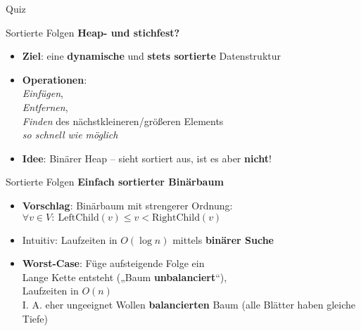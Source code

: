 \begin{frame}[t]{Quiz}
\end{frame}	



\begin{frame}{Sortierte Folgen}
	\textbf{Heap- und stichfest?} 
	\begin{itemize}
		\item \textbf{Ziel}: eine \textbf{dynamische} und \textbf{stets sortierte} Datenstruktur
		\pause
		\item \textbf{Operationen}: \\ 
		\emph{Einfügen}, \\
		\emph{Entfernen}, \\
		\emph{Finden} des nächstkleineren/größeren Elements \\
		\impl \emph{so schnell wie möglich}
		\pause
		\item \textbf{Idee}: Binärer Heap – sieht sortiert aus, ist es aber \textbf{nicht}!
	\end{itemize}
\end{frame}

\begin{frame}{Sortierte Folgen}
	\textbf{Einfach sortierter Binärbaum} 
	\begin{itemize} 
		\item \textbf{Vorschlag}: Binärbaum mit strengerer Ordnung: \\
		$\forall v \in V : \ \text{LeftChild}(v) \leq v < \text{RightChild}(v)$
		\pause
		\item Intuitiv: Laufzeiten in $O(\log n)$ mittels \textbf{binärer Suche}
		\pause
		\item[\Cons] \textbf{Worst-Case}: Füge aufsteigende Folge ein \\
		\impl Lange Kette entsteht („Baum \textbf{unbalanciert}“), \\
		Laufzeiten in $O(n)$ \frownie \\
		\pause
		\impl I. A. eher ungeeignet
		\pause
		\implitem Wollen \textbf{balancierten} Baum (alle Blätter haben gleiche Tiefe) 
	\end{itemize}
\end{frame}

